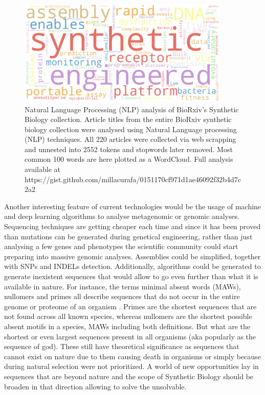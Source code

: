 \begin{figure}[!ht]
  \centering
  \includegraphics[width=0.9\textwidth]{discussion/chapter/figs/wordcloud.png}
  \caption{Natural Language Processing (NLP) analysis of BioRxiv's Synthetic Biology collection. Article titles from the entire BioRxiv synthetic biology collection were analysed using Natural Language processing (NLP) techniques. All 220 articles were collected via web scrapping and unnested into 2552 tokens and stopwords later removed. Most common 100 words are here plotted as a WordCloud. Full analysis available at https://gist.github.com/millacurafa/0151170cf971d1ae46092f32b4d7c2a2}
  \label{fig.discu4}
\end{figure}

Another interesting feature of current technologies would be the usage of machine and deep learning algorithms to analyse metagenomic or genomic analyses. Sequencing techniques are getting cheaper each time and since it has been proved than mutations can be generated during genetical engineering, rather than just analysing a few genes and phenotypes the scientific community could start preparing into massive genomic analyses. Assemblies could be simplified, together with SNPs and INDELs detection. Additionally, algorithms could be generated to generate inexistent sequences that would allow to go even further than what it is available in nature. For instance, the terms minimal absent words (MAWs), nullomers and primes all describe sequences that do not occur in the entire genome or proteome of an organism \citep{hampikian2007absent, koulouras2020significant}. Primes are the shortest sequences that are not found across all known species, whereas nullomers are the shortest possible absent motifs in a species, MAWs including both definitions. But what are the shortest or even largest sequences present in all organisms (aka popularly as the sequence of god). These still have theoretical significance as sequences that cannot exist on nature due to them causing death in organisms or simply because during natural selection were not prioritized. A world of new opportunities lay in sequences that are beyond nature and the scope of Synthetic Biology should be broaden in that direction allowing to solve the unsolvable.